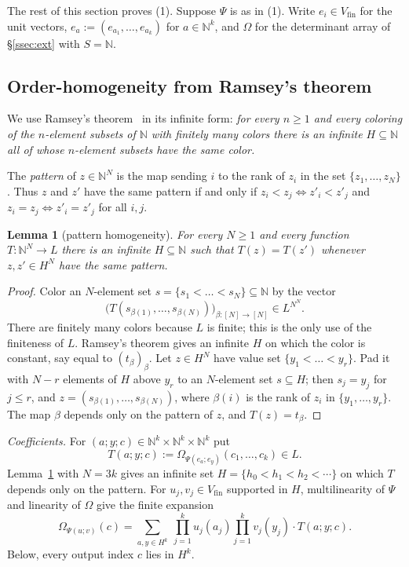 \documentclass[11pt]{amsart}
\newtheorem{lemma}[theorem]{Lemma}
\theoremstyle{definition}
\theoremstyle{remark}
\numberwithin{equation}{section}
\newcommand{\N}{\mathbb{N}}
\begin{document}
The rest of this section proves (1). Suppose $\Psi$ is as in (1). Write $e_i\in V_{\mathrm{fin}}$ for the unit vectors,
$e_a:=(e_{a_1},\dots,e_{a_k})$ for $a\in\N^k$, and $\Omega$ for the determinant array of \S\ref{ssec:ext} with $S=\N$.

\subsection{Order-homogeneity from Ramsey's theorem}
We use Ramsey's theorem~\cite{Ra} in its infinite form: \emph{for every $n\ge1$ and every coloring of the
$n$\nobreakdash-element subsets of $\N$ with finitely many colors there is an infinite $H\subseteq\N$ all of whose $n$\nobreakdash-element
subsets have the same color.}

The \emph{pattern} of $z\in\N^N$ is the map sending $i$ to the rank of $z_i$ in the set $\{z_1,\dots,z_N\}$. Thus $z$ and
$z'$ have the same pattern if and only if $z_i<z_j\Leftrightarrow z'_i<z'_j$ and $z_i=z_j\Leftrightarrow z'_i=z'_j$ for
all $i,j$.

\begin{lemma}[pattern homogeneity]\label{lem:H}
For every $N\ge1$ and every function $T\colon\N^N\to L$ there is an infinite $H\subseteq\N$ such that $T(z)=T(z')$
whenever $z,z'\in H^N$ have the same pattern.
\end{lemma}

\begin{proof}
Color an $N$\nobreakdash-element set $s=\{s_1<\dots<s_N\}\subseteq\N$ by the vector
\[
\bigl(T(s_{\beta(1)},\dots,s_{\beta(N)})\bigr)_{\beta\colon[N]\to[N]}\in L^{N^N}.
\]
There are finitely many colors because
$L$ is finite; this is the only use of the finiteness of $L$. Ramsey's theorem gives an infinite $H$ on which the color
is constant, say equal to $(t_\beta)_\beta$. Let $z\in H^N$ have value set $\{y_1<\dots<y_r\}$. Pad it with $N-r$
elements of $H$ above $y_r$ to an $N$\nobreakdash-element set $s\subseteq H$; then $s_j=y_j$ for $j\le r$, and
$z=(s_{\beta(1)},\dots,s_{\beta(N)})$, where $\beta(i)$ is the rank of $z_i$ in $\{y_1,\dots,y_r\}$. The map $\beta$
depends only on the pattern of $z$, and $T(z)=t_\beta$.
\end{proof}

\emph{Coefficients.} For $(a;y;c)\in\N^k\times\N^k\times\N^k$ put
\[
T(a;y;c):=\Omega_{\Psi(e_a;e_y)}(c_1,\dots,c_k)\in L .
\]
Lemma~\ref{lem:H} with $N=3k$ gives an infinite set $H=\{h_0<h_1<h_2<\cdots\}$ on which $T$ depends only on the pattern.
For $u_j,v_j\in V_{\mathrm{fin}}$ supported in $H$, multilinearity of $\Psi$ and linearity of $\Omega$ give the finite
expansion
\begin{equation}\label{eq:expand}
\Omega_{\Psi(u;v)}(c)=\sum_{a,y\in H^k}\ \prod_{j=1}^ku_j(a_j)\prod_{j=1}^kv_j(y_j)\cdot T(a;y;c).
\end{equation}
Below, every output index $c$ lies in $H^k$.
\end{document}
